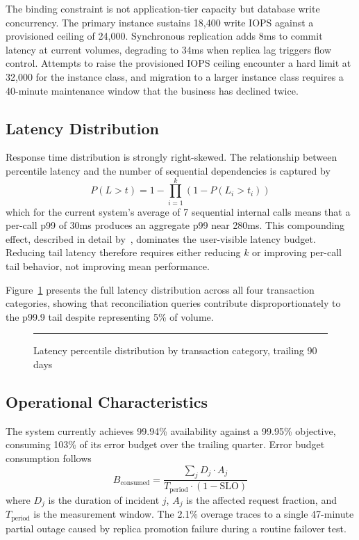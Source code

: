 The binding constraint is not application-tier capacity but database write concurrency. The primary instance sustains 18,400 write IOPS against a provisioned ceiling of 24,000. Synchronous replication adds 8ms to commit latency at current volumes, degrading to 34ms when replica lag triggers flow control. Attempts to raise the provisioned IOPS ceiling encounter a hard limit at 32,000 for the instance class, and migration to a larger instance class requires a 40-minute maintenance window that the business has declined twice.

\subsection{Latency Distribution}

Response time distribution is strongly right-skewed. The relationship between percentile latency and the number of sequential dependencies is captured by
\begin{equation}
\label{eq:percentile-latency}
P(L > t) = 1 - \prod_{i=1}^{k} \left(1 - P(L_i > t_i)\right)
\end{equation}
which for the current system's average of 7 sequential internal calls means that a per-call p99 of 30ms produces an aggregate p99 near 280ms. This compounding effect, described in detail by~\cite{dean-tail-at-scale-2013}, dominates the user-visible latency budget. Reducing tail latency therefore requires either reducing $k$ or improving per-call tail behavior, not improving mean performance.

Figure~\ref{fig:latency-percentiles-comparison} presents the full latency distribution across all four transaction categories, showing that reconciliation queries contribute disproportionately to the p99.9 tail despite representing 5\% of volume.

\begin{figure}[htbp]
\centering
\rule{0.8\textwidth}{0.35\textwidth}
\caption{Latency percentile distribution by transaction category, trailing 90 days}
\label{fig:latency-percentiles-comparison}
\end{figure}

\subsection{Operational Characteristics}

The system currently achieves 99.94\% availability against a 99.95\% objective, consuming 103\% of its error budget over the trailing quarter. Error budget consumption follows
\begin{equation}
\label{eq:error-budget}
B_{\text{consumed}} = \frac{\sum_{j} D_j \cdot A_j}{T_{\text{period}} \cdot (1 - \text{SLO})}
\end{equation}
where $D_j$ is the duration of incident $j$, $A_j$ is the affected request fraction, and $T_{\text{period}}$ is the measurement window. The 2.1\% overage traces to a single 47-minute partial outage caused by replica promotion failure during a routine failover test.

